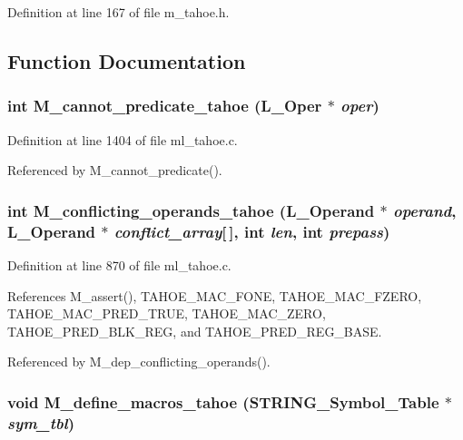 Definition at line 167 of file m\_\-tahoe.h.

\subsection{Function Documentation}
\subsubsection{\setlength{\rightskip}{0pt plus 5cm}int M\_\-cannot\_\-predicate\_\-tahoe (L\_\-Oper $\ast$ {\em oper})}\label{m__tahoe_8h_e64949c9b8dfe83e479a086fe8eb1c24}




Definition at line 1404 of file ml\_\-tahoe.c.

Referenced by M\_\-cannot\_\-predicate().
\subsubsection{\setlength{\rightskip}{0pt plus 5cm}int M\_\-conflicting\_\-operands\_\-tahoe (L\_\-Operand $\ast$ {\em operand}, L\_\-Operand $\ast$ {\em conflict\_\-array}[$\,$], int {\em len}, int {\em prepass})}\label{m__tahoe_8h_823462c9cf92055926ab0965c96537e3}




Definition at line 870 of file ml\_\-tahoe.c.

References M\_\-assert(), TAHOE\_\-MAC\_\-FONE, TAHOE\_\-MAC\_\-FZERO, TAHOE\_\-MAC\_\-PRED\_\-TRUE, TAHOE\_\-MAC\_\-ZERO, TAHOE\_\-PRED\_\-BLK\_\-REG, and TAHOE\_\-PRED\_\-REG\_\-BASE.

Referenced by M\_\-dep\_\-conflicting\_\-operands().
\subsubsection{\setlength{\rightskip}{0pt plus 5cm}void M\_\-define\_\-macros\_\-tahoe (\bf{STRING\_\-Symbol\_\-Table} $\ast$ {\em sym\_\-tbl})}\label{m__tahoe_8h_33b23d1f3e10f1f11661c8e345e77630}




